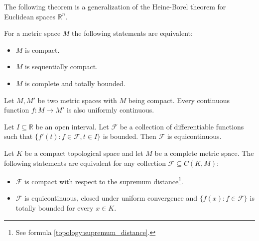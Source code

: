     The following theorem is a generalization of the Heine-Borel theorem for Euclidean spaces $\mathbb{R}^n$.
    \begin{theorem}
        For a metric space $M$ the following statements are equivalent:
        \begin{itemize}
            \item $M$ is compact.
            \item $M$ is sequentially compact.
            \item $M$ is complete and totally bounded.
        \end{itemize}
    \end{theorem}

    \begin{theorem}
        Let $M, M'$ be two metric spaces with $M$ being compact. Every continuous function $f:M\rightarrow M'$ is also uniformly continuous.
    \end{theorem}


    \begin{property}
        Let $I\subseteq\mathbb{R}$ be an open interval. Let $\mathcal{F}$ be a collection of differentiable functions such that $\{f'(t):f\in\mathcal{F}, t\in I\}$ is bounded. Then $\mathcal{F}$ is equicontinuous.
    \end{property}

    \begin{theorem}
        Let $K$ be a compact topological space and let $M$ be a complete metric space. The following statements are equivalent for any collection $\mathcal{F}\subseteq C(K, M)$:
        \begin{itemize}
            \item $\mathcal{F}$ is compact with respect to the supremum distance\footnote{See formula \ref{topology:supremum_distance}.}.
            \item $\mathcal{F}$ is equicontinuous, closed under uniform convergence and $\{f(x):f\in\mathcal{F}\}$ is totally bounded for every $x\in K$.
        \end{itemize}
    \end{theorem}